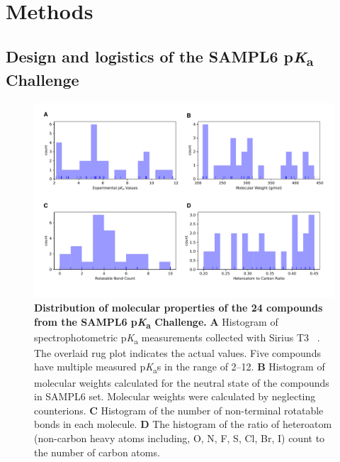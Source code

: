 \documentclass[9pt,lineno,final]{elife}
\newcommand{\pKa}{p\textit{K}\textsubscript{a}}
\begin{document}
\section{Methods}

\subsection{Design and logistics of the SAMPL6 \pKa{} Challenge}

\begin{figure}
\begin{center}
\includegraphics[width=1.0\linewidth]{figures/distribution_of_molecular_properties.pdf}
\caption{{\bf Distribution of molecular properties of the 24 compounds from the SAMPL6 \pKa{} Challenge.} 
{\bf A} Histogram of spectrophotometric \pKa{} measurements collected with Sirius T3 ~\cite{Isik:2018:J.Comput.AidedMol.Des.}. 
The overlaid rug plot indicates the actual values. 
Five compounds have multiple measured \pKa{}s in the range of 2--12. 
{\bf B} Histogram of molecular weights calculated for the neutral state of the compounds in SAMPL6 set. 
Molecular weights were calculated by neglecting counterions.  
{\bf C} Histogram of the number of non-terminal rotatable bonds in each molecule. 
{\bf D} The histogram of the ratio of heteroatom (non-carbon heavy atoms including, O, N, F, S, Cl, Br, I) count to the number of carbon atoms.
}
\label{fig:dist_mol_prop}
\end{center}
\end{figure}
\end{document}
